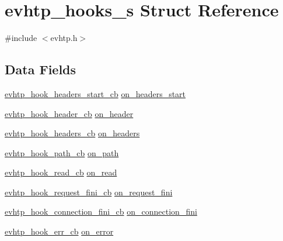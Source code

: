 \hypertarget{structevhtp__hooks__s}{\section{evhtp\-\_\-hooks\-\_\-s \-Struct \-Reference}
\label{structevhtp__hooks__s}
}


{\ttfamily \#include $<$evhtp.\-h$>$}

\subsection*{\-Data \-Fields}
\begin{DoxyCompactItemize}
\item 
\hyperlink{evhtp_8h_af82b00357c4e0b2c5b3ab3cf9aefadad}{evhtp\-\_\-hook\-\_\-headers\-\_\-start\-\_\-cb} \hyperlink{structevhtp__hooks__s_a3a26790aee39951ecdb3ff99d50624b0}{on\-\_\-headers\-\_\-start}
\item 
\hyperlink{evhtp_8h_a2cddb211091dc5b19e57188a9104c34f}{evhtp\-\_\-hook\-\_\-header\-\_\-cb} \hyperlink{structevhtp__hooks__s_a3062e8d2a83147219affa3c69ef3abfe}{on\-\_\-header}
\item 
\hyperlink{evhtp_8h_aef2db349d398a565e2408694e1e8b646}{evhtp\-\_\-hook\-\_\-headers\-\_\-cb} \hyperlink{structevhtp__hooks__s_a0afaaf69ca2cb4386475120fbff830f8}{on\-\_\-headers}
\item 
\hyperlink{evhtp_8h_ae389ed1d9a3addcaa39bc4b286e12fab}{evhtp\-\_\-hook\-\_\-path\-\_\-cb} \hyperlink{structevhtp__hooks__s_a955ae840d237ccd632bd47e2ffe74908}{on\-\_\-path}
\item 
\hyperlink{evhtp_8h_a1c1df6bb6154893dd2d7e46999ea5f2d}{evhtp\-\_\-hook\-\_\-read\-\_\-cb} \hyperlink{structevhtp__hooks__s_a03ab0478633f5599bd5630a3a93c4add}{on\-\_\-read}
\item 
\hyperlink{evhtp_8h_a8653bf424ac2974da47ceb54ed131889}{evhtp\-\_\-hook\-\_\-request\-\_\-fini\-\_\-cb} \hyperlink{structevhtp__hooks__s_a6ac6a986b72cd6ddb313d5473b24a775}{on\-\_\-request\-\_\-fini}
\item 
\hyperlink{evhtp_8h_a7305964a053bfbf2bbab00a56e87c63d}{evhtp\-\_\-hook\-\_\-connection\-\_\-fini\-\_\-cb} \hyperlink{structevhtp__hooks__s_ab5055f169a8bd03bf41956a7e4cd752d}{on\-\_\-connection\-\_\-fini}
\item 
\hyperlink{evhtp_8h_accee2d620d476bc387b20ac035bd4233}{evhtp\-\_\-hook\-\_\-err\-\_\-cb} \hyperlink{structevhtp__hooks__s_ae5840f4ca13d16882f8bc84b306a7d9f}{on\-\_\-error}
\item 

\end{DoxyCompactItemize}
